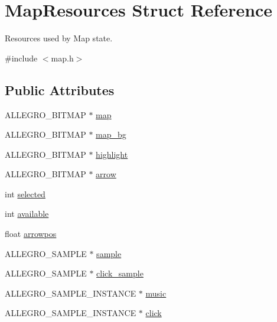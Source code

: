 \hypertarget{structMapResources}{\section{Map\+Resources Struct Reference}
\label{structMapResources}
}


Resources used by Map state.  




{\ttfamily \#include $<$map.\+h$>$}

\subsection*{Public Attributes}
\begin{DoxyCompactItemize}
\item 
A\+L\+L\+E\+G\+R\+O\+\_\+\+B\+I\+T\+M\+A\+P $\ast$ \hyperlink{structMapResources_a3ff4f6cd4a1ba2c757bff8d3073df3bc}{map}
\item 
A\+L\+L\+E\+G\+R\+O\+\_\+\+B\+I\+T\+M\+A\+P $\ast$ \hyperlink{structMapResources_afc6674a59c750770cc515f10e4b4d656}{map\+\_\+bg}
\item 
A\+L\+L\+E\+G\+R\+O\+\_\+\+B\+I\+T\+M\+A\+P $\ast$ \hyperlink{structMapResources_ad37b071d815d22a476d2f1d1b4ad2e56}{highlight}
\item 
A\+L\+L\+E\+G\+R\+O\+\_\+\+B\+I\+T\+M\+A\+P $\ast$ \hyperlink{structMapResources_aa90662f13dc99283ecd4f9fc3dd1f8a2}{arrow}
\item 
int \hyperlink{structMapResources_a4ab1ed730044bd56cf036371c0ef9cfe}{selected}
\item 
int \hyperlink{structMapResources_a67de73f0e4860f35a6a8a8346fe7825d}{available}
\item 
float \hyperlink{structMapResources_ac27a26e5e5e399479d63d57359890016}{arrowpos}
\item 
A\+L\+L\+E\+G\+R\+O\+\_\+\+S\+A\+M\+P\+L\+E $\ast$ \hyperlink{structMapResources_a3bdd93c64d58e018e48c4ac220fd85dd}{sample}
\item 
A\+L\+L\+E\+G\+R\+O\+\_\+\+S\+A\+M\+P\+L\+E $\ast$ \hyperlink{structMapResources_a67961c30f705207e424e592cf2c62232}{click\+\_\+sample}
\item 
A\+L\+L\+E\+G\+R\+O\+\_\+\+S\+A\+M\+P\+L\+E\+\_\+\+I\+N\+S\+T\+A\+N\+C\+E $\ast$ \hyperlink{structMapResources_aad2fee17c3652e5b87ec439c64bd1052}{music}
\item 
A\+L\+L\+E\+G\+R\+O\+\_\+\+S\+A\+M\+P\+L\+E\+\_\+\+I\+N\+S\+T\+A\+N\+C\+E $\ast$ \hyperlink{structMapResources_a57c95eb4998c4d6aa4c9458b289a976b}{click}
\end{DoxyCompactItemize}


